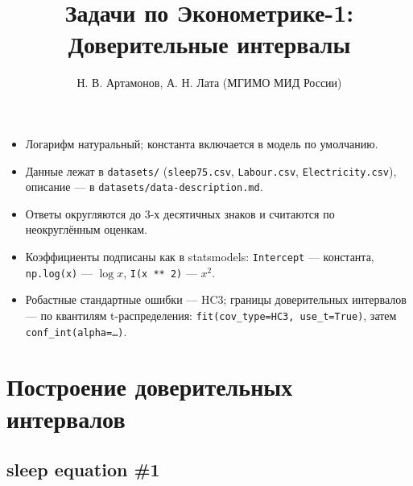 \documentclass[
  russian,
]{article}
\title{Задачи по Эконометрике-1: Доверительные интервалы}
\author{Н. В. Артамонов, А. Н. Лата (МГИМО МИД России)}
\date{}
\providecommand{\tightlist}{%
  \setlength{\itemsep}{0pt}\setlength{\parskip}{0pt}}
\renewcommand*\contentsname{Содержание}
\newcommand\contentsname{Содержание}
\begin{document}
\maketitle

\renewcommand*\contentsname{Содержание}
{
\setcounter{tocdepth}{3}
\tableofcontents
}

\begin{tcolorbox}[enhanced jigsaw, arc=.35mm, bottomrule=.15mm, bottomtitle=1mm, breakable, colback=white, colbacktitle=quarto-callout-important-color!10!white, colframe=quarto-callout-important-color-frame, coltitle=black, left=2mm, leftrule=.75mm, opacityback=0, opacitybacktitle=0.6, rightrule=.15mm, title=\textcolor{quarto-callout-important-color}{\faExclamation}\hspace{0.5em}{Важно}, titlerule=0mm, toprule=.15mm, toptitle=1mm]

\begin{itemize}
\tightlist
\item
  Логарифм натуральный; константа включается в модель по умолчанию.
\item
  Данные лежат в \texttt{datasets/} (\texttt{sleep75.csv},
  \texttt{Labour.csv}, \texttt{Electricity.csv}), описание --- в
  \texttt{datasets/data-description.md}.
\item
  Ответы округляются до 3-х десятичных знаков и считаются по
  неокруглённым оценкам.
\item
  Коэффициенты подписаны как в statsmodels: \texttt{Intercept} ---
  константа, \texttt{np.log(x)} --- \(\log x\), \texttt{I(x\ **\ 2)} ---
  \(x^2\).
\item
  Робастные стандартные ошибки --- HC3; границы доверительных интервалов
  --- по квантилям t-распределения:
  \texttt{fit(cov\_type=\textquotesingle{}HC3\textquotesingle{},\ use\_t=True)},
  затем \texttt{conf\_int(alpha=…)}.
\end{itemize}

\end{tcolorbox}

\section{Построение доверительных
интервалов}\label{ux43fux43eux441ux442ux440ux43eux435ux43dux438ux435-ux434ux43eux432ux435ux440ux438ux442ux435ux43bux44cux43dux44bux445-ux438ux43dux442ux435ux440ux432ux430ux43bux43eux432}

\subsection{sleep equation \#1}\label{sleep-equation-1}
\end{document}
